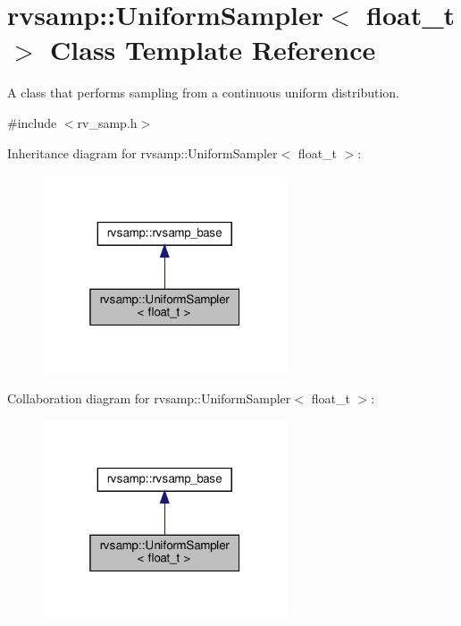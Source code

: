 \hypertarget{classrvsamp_1_1UniformSampler}{}\section{rvsamp\+:\+:Uniform\+Sampler$<$ float\+\_\+t $>$ Class Template Reference}
\label{classrvsamp_1_1UniformSampler}


A class that performs sampling from a continuous uniform distribution.  




{\ttfamily \#include $<$rv\+\_\+samp.\+h$>$}



Inheritance diagram for rvsamp\+:\+:Uniform\+Sampler$<$ float\+\_\+t $>$\+:
\nopagebreak
\begin{figure}[H]
\begin{center}
\leavevmode
\includegraphics[width=205pt]{classrvsamp_1_1UniformSampler__inherit__graph}
\end{center}
\end{figure}


Collaboration diagram for rvsamp\+:\+:Uniform\+Sampler$<$ float\+\_\+t $>$\+:
\nopagebreak
\begin{figure}[H]
\begin{center}
\leavevmode
\includegraphics[width=205pt]{classrvsamp_1_1UniformSampler__coll__graph}
\end{center}
\end{figure}
